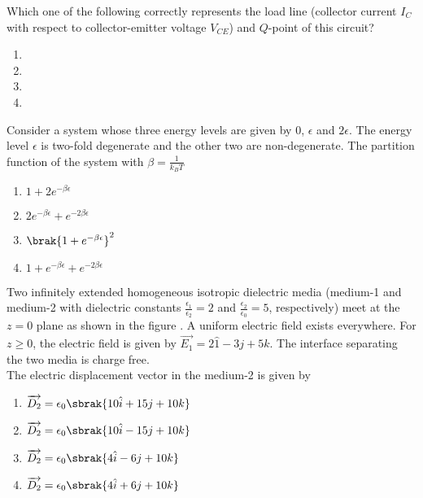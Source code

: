 	
	Which one of the following correctly represents the load line (collector current $I_C$ with respect to collector-emitter voltage $V_{CE}$) and $Q$-point of this circuit?
\begin{enumerate}
    \item
	    
    \item 
	    
    \item 
	    
    \item 
	    
   \end{enumerate}
\item Consider a system whose three energy levels are given by 0, $\epsilon$ and $2\epsilon$. The energy level $\epsilon$ is two-fold degenerate and the other two are non-degenerate. The partition function of the system with $\beta=\frac{1}{k_BT}$
\begin{enumerate}
    \item $1+2e^{-\beta \epsilon}$
    \item $2e^{-\beta \epsilon}+e^{-2\beta \epsilon}$
    \item $\brak{1+e^{-\beta \epsilon}}^2$
    \item $1+e^{-\beta \epsilon}+e^{-2\beta \epsilon}$
\end{enumerate}
\item Two infinitely extended homogeneous isotropic dielectric media (medium-1 and medium-2 with dielectric constants $\frac{\epsilon_1}{\epsilon_2}=2$ and $\frac{\epsilon_2}{\epsilon_0}=5$, respectively) meet at the $z=0$ plane as shown in the figure . A uniform electric field exists everywhere. For $z \geq 0$, the electric field is given by $\overrightarrow{E_1}=2\hat{1}-3j+5k$. The interface separating the two media is charge free.\\ The electric displacement vector in the medium-2 is given by 
	
	\begin{enumerate}
    \item $\overrightarrow{D_2}=\epsilon_0\sbrak{10\hat{i}+15j+10k}$
    \item $\overrightarrow{D_2}=\epsilon_0\sbrak{10\hat{i}-15j+10k}$
    \item $\overrightarrow{D_2}=\epsilon_0\sbrak{4\hat{i}-6j+10k}$
    \item $\overrightarrow{D_2}=\epsilon_0\sbrak{4\hat{i}+6j+10k}$
\end{enumerate}


